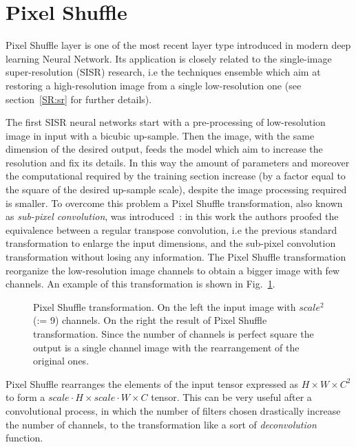 \documentclass{standalone}
\begin{document}

\section[Pixel Shuffle]{Pixel Shuffle}\label{NN:shuffler}

Pixel Shuffle layer is one of the most recent layer type introduced in modern deep learning Neural Network.
Its application is closely related to the single-image super-resolution (SISR) research, i.e the techniques ensemble which aim at restoring a high-resolution image from a single low-resolution one (see section~\ref{SR:sr} for further details).

The first SISR neural networks start with a pre-processing of low-resolution image in input with a bicubic up-sample.
Then the image, with the same dimension of the desired output, feeds the model which aim to increase the resolution and fix its details.
In this way the amount of parameters and moreover the computational required by the training section increase (by a factor equal to the square of the desired up-sample scale), despite the image processing required is smaller.
To overcome this problem a Pixel Shuffle transformation, also known as \emph{sub-pixel convolution}, was introduced~\cite{Wenzhe2016Shuffle}: in this work the authors proofed the equivalence between a regular transpose convolution, i.e the previous standard transformation to enlarge the input dimensions, and the sub-pixel convolution transformation without losing any information.
The Pixel Shuffle transformation reorganize the low-resolution image channels to obtain a bigger image with few channels.
An example of this transformation is shown in Fig.~\ref{fig:pixel_shuffle}.

\begin{figure}[htbp]
\centering
\def\svgwidth{0.7\textwidth}

\caption{Pixel Shuffle transformation.
On the left the input image with $scale^2$ (:= 9) channels.
On the right the result of Pixel Shuffle transformation.
Since the number of channels is perfect square the output is a single channel image with the rearrangement of the original ones.
}
\label{fig:pixel_shuffle}
\end{figure}

Pixel Shuffle rearranges the elements of the input tensor expressed as $H \times W \times C^2$ to form a $scale \cdot H \times scale \cdot W \times C$ tensor.
This can be very useful after a convolutional process, in which the number of filters chosen drastically increase the number of channels, to  the transformation like a sort of \emph{deconvolution} function.
\end{document}
